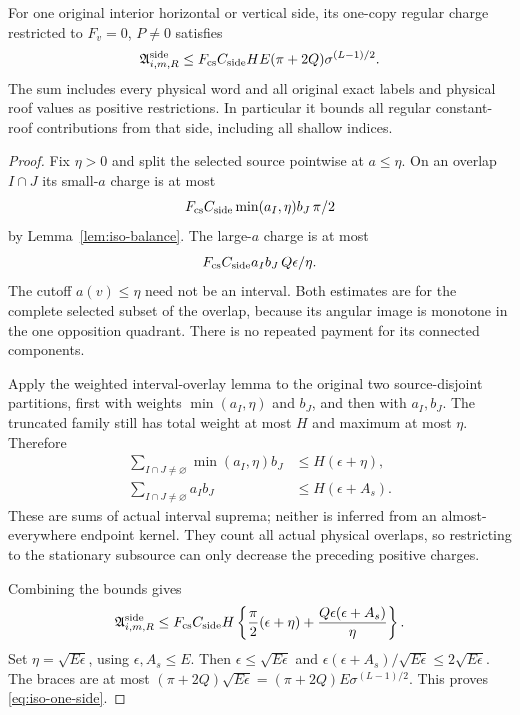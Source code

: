 \begin{theorem}
\label{thm:iso-interior}
For one original interior horizontal or vertical side, its
one-copy regular charge restricted to $F_v=0$, $P\ne0$ satisfies
\begin{equation}\label{eq:iso-one-side}
 \mathfrak A^{\rm side}_{i,m,R}
 \le F_{\rm cs}C_{\rm side}HE(\pi+2Q)
                         \sigma^{(L-1)/2}.
\end{equation}
The sum includes every physical word and all original exact labels
and physical roof values as positive restrictions. In particular
it bounds all regular constant-roof contributions from that side,
including all shallow indices.
\end{theorem}
\begin{proof}
Fix $\eta>0$ and split the selected source pointwise at $a\le\eta$.
On an overlap $I\cap J$ its small-$a$ charge is at most
\[
 F_{\rm cs}C_{\rm side}\min(a_I,\eta)b_J\,\pi/2
\]
by Lemma~\ref{lem:iso-balance}. The large-$a$ charge is at most
\[
 F_{\rm cs}C_{\rm side}a_Ib_J\,Q\epsilon/\eta.
\]
The cutoff $a(v)\le\eta$ need not be an interval. Both estimates
are for the complete selected subset of the overlap, because its
angular image is monotone in the one opposition quadrant.
There is no repeated payment for its connected components.

Apply the weighted interval-overlay lemma to the original two
source-disjoint partitions, first with weights
$\min(a_I,\eta)$ and $b_J$, and then with $a_I,b_J$.
The truncated family still has total weight at most $H$ and
maximum at most $\eta$. Therefore
\begin{align*}
 \sum_{I\cap J\ne\varnothing}\min(a_I,\eta)b_J
       &\le H(\epsilon+\eta),\\
 \sum_{I\cap J\ne\varnothing}a_Ib_J
       &\le H(\epsilon+A_s).
\end{align*}
These are sums of actual interval suprema; neither is inferred
from an almost-everywhere endpoint kernel. They count all actual
physical overlaps, so restricting to the stationary subsource
can only decrease the preceding positive charges.

Combining the bounds gives
\[
 \mathfrak A^{\rm side}_{i,m,R}
 \le F_{\rm cs}C_{\rm side}H
 \left\{\frac{\pi}{2}(\epsilon+\eta)
                 +\frac{Q\epsilon(\epsilon+A_s)}{\eta}\right\}.
\]
Set $\eta=\sqrt{E\epsilon}$, using $\epsilon,A_s\le E$.
Then $\epsilon\le\sqrt{E\epsilon}$ and
$\epsilon(\epsilon+A_s)/\sqrt{E\epsilon}\le2\sqrt{E\epsilon}$.
The braces are at most
$(\pi+2Q)\sqrt{E\epsilon}
=(\pi+2Q)E\sigma^{(L-1)/2}$.
This proves \eqref{eq:iso-one-side}.


\end{proof}
